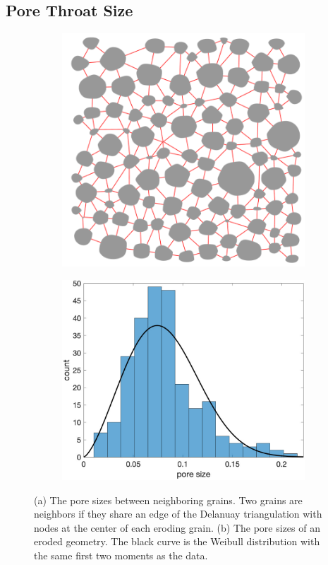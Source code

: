 \documentclass{jfm}
\begin{document}
\subsection{Pore Throat Size}
\label{sec:throats}
\begin{figure}
\begin{subfigure}[b]{0.5\textwidth}
\includegraphics*[height =0.8\linewidth]{./figs/triangulation_100b100}
\caption{}
\end{subfigure}
\begin{subfigure}[b]{0.5\textwidth}
\includegraphics*[height = 0.8\linewidth]{./figs/gap_hist100b100}
\caption{}
\end{subfigure}
\caption{\label{fig:Eroding100gap} (a) The pore sizes between
neighboring grains. Two grains are neighbors if they share an edge of
the Delanuay triangulation with nodes at the center of each eroding
grain. (b) The pore sizes of an eroded geometry. The black curve is the
Weibull distribution with the same first two moments as the data.}
\end{figure}
\end{document}

